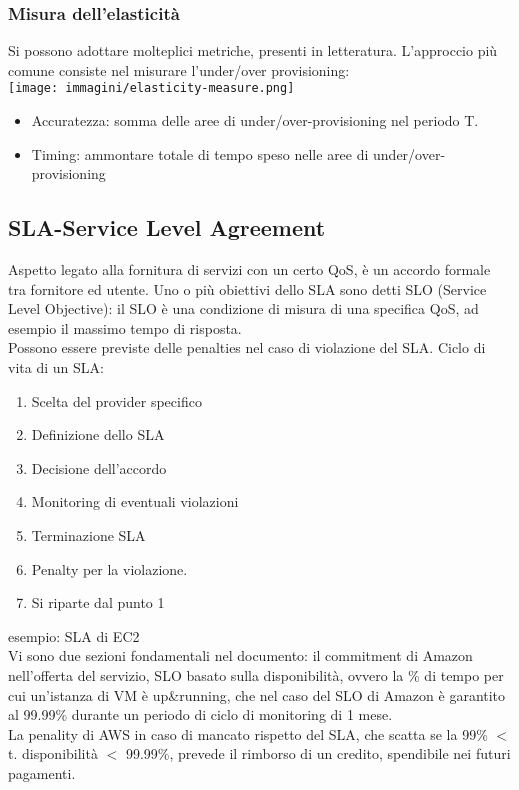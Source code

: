 \documentclass{article}
\begin{document}
\subsubsection{Misura dell'elasticità}
Si possono adottare molteplici metriche, presenti in letteratura. L'approccio più comune consiste nel misurare l'under/over provisioning:\\
\texttt{[image: immagini/elasticity-measure.png]}\\
\begin{itemize}
\item Accuratezza: somma delle aree di under/over-provisioning nel periodo T.
\item Timing: ammontare totale di tempo speso nelle aree di under/over-provisioning
\end{itemize}
\subsection{SLA-Service Level Agreement}
Aspetto legato alla fornitura di servizi con un certo QoS, è un accordo formale tra fornitore ed utente. Uno o più obiettivi dello SLA sono detti SLO (Service Level Objective): il SLO è una condizione di misura di una specifica QoS, ad esempio il massimo tempo di risposta.\\ Possono essere previste delle penalties nel caso di violazione del SLA. Ciclo di vita di un SLA:
\begin{enumerate}
\item Scelta del provider specifico
\item Definizione dello SLA
\item Decisione dell'accordo
\item Monitoring di eventuali violazioni
\item Terminazione SLA
\item Penalty per la violazione.
\item Si riparte dal punto 1
\end{enumerate}
esempio: SLA di EC2\\
Vi sono due sezioni fondamentali nel documento: il commitment di Amazon nell'offerta del servizio, SLO basato sulla disponibilità, ovvero la \% di tempo per cui un'istanza di VM è up\&running, che nel caso del SLO di Amazon è garantito al 99.99\% durante un periodo di ciclo di monitoring di 1 mese.\\ La penality di AWS in caso di mancato rispetto del SLA, che scatta se la 99\% $<$t. disponibilità $<$ 99.99\%, prevede il rimborso di un credito, spendibile nei futuri pagamenti.
\end{document}
